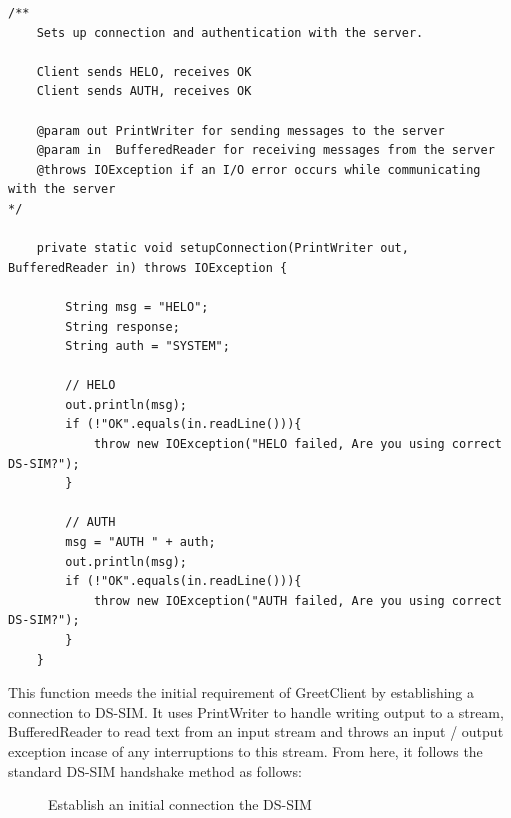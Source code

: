 \begin{lstlisting}
/**
    Sets up connection and authentication with the server.

    Client sends HELO, receives OK
    Client sends AUTH, receives OK
     
    @param out PrintWriter for sending messages to the server
    @param in  BufferedReader for receiving messages from the server
    @throws IOException if an I/O error occurs while communicating with the server
*/

    private static void setupConnection(PrintWriter out, BufferedReader in) throws IOException {
  
        String msg = "HELO";
        String response;
        String auth = "SYSTEM";

        // HELO
        out.println(msg);
        if (!"OK".equals(in.readLine())){
            throw new IOException("HELO failed, Are you using correct DS-SIM?");
        }

        // AUTH
        msg = "AUTH " + auth;
        out.println(msg);
        if (!"OK".equals(in.readLine())){
            throw new IOException("AUTH failed, Are you using correct DS-SIM?");
        }
    }
\end{lstlisting}
This function meeds the initial requirement of GreetClient by establishing a connection to DS-SIM. It uses PrintWriter to handle writing output to a stream, BufferedReader to read text from an input stream and throws an input / output exception incase of any interruptions to this stream. From here, it follows the standard DS-SIM handshake method as follows:

\begin{figure}[h]
    \centering
    \caption{Establish an initial connection the DS-SIM}
    \label{fig:communication}
\end{figure}

